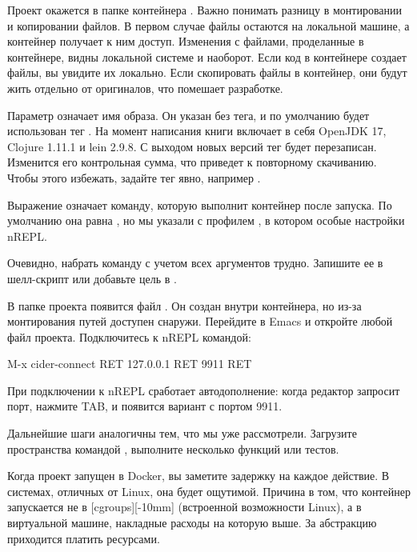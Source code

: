 Проект окажется в папке контейнера . Важно понимать разницу в монтировании и копировании файлов. В первом случае файлы остаются на локальной машине, а контейнер получает к ним доступ. Изменения с файлами, проделанные в контейнере, видны локальной системе и наоборот. Если код в контейнере создает файлы, вы увидите их локально. Если скопировать файлы в контейнер, они будут жить отдельно от оригиналов, что помешает разработке.

Параметр   означает имя образа. Он указан без тега, и по умолчанию будет использован тег . На момент написания книги  включает в себя OpenJDK 17, Clojure 1.11.1 и lein 2.9.8. С выходом новых версий тег  будет перезаписан. Изменится его контрольная сумма, что приведет к повторному скачиванию. Чтобы этого избежать, задайте тег явно, например .

Выражение   означает команду, которую выполнит контейнер после запуска. По умолчанию она равна , но мы указали  с профилем , в котором особые настройки nREPL.

Очевидно, набрать команду  с учетом всех аргументов трудно. Запишите ее в шелл-скрипт или добавьте цель в .

В папке проекта появится файл . Он создан внутри контейнера, но из-за монтирования путей доступен снаружи. Перейдите в Emacs и откройте любой файл проекта. Подключитесь к nREPL командой:

\begin{english}
  \begin{text}
M-x cider-connect RET 127.0.0.1 RET 9911 RET
  \end{text}
\end{english}

При подключении к nREPL сработает автодополнение: когда редактор запросит порт, нажмите TAB, и появится вариант с портом 9911.

Дальнейшие шаги аналогичны тем, что мы уже рассмотрели. Загрузите пространства командой , выполните несколько функций или тестов.

\def\urlcgroups{https://en.wikipedia.org/wiki/Cgroups}

Когда проект запущен в Docker, вы заметите задержку на каждое действие. В системах, отличных от Linux, она будет ощутимой. Причина в том, что контейнер запускается не в \footurl{cgroups}{\urlcgroups}[cgroups][-10mm] (встроенной возможности Linux), а в виртуальной машине, накладные расходы на которую выше. За абстракцию приходится платить ресурсами.

